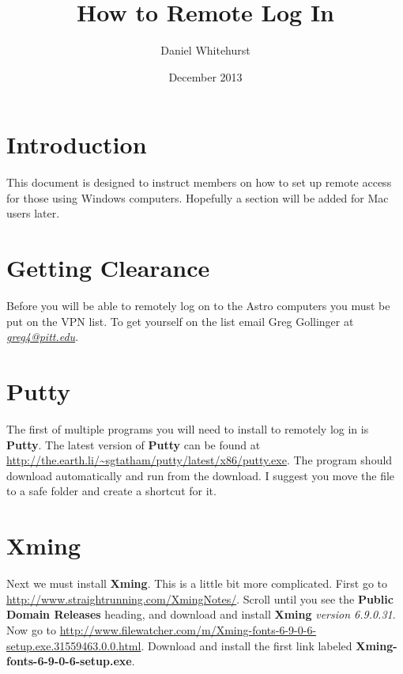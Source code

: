 \documentclass[11pt, preprint]{aastex}
\begin{document}
\title{How to Remote Log In}
\author{Daniel Whitehurst}
\date{December 2013}

\section{Introduction}
This document is designed to instruct members on how to set up remote access for those using Windows computers. Hopefully a section will be added for Mac users later.

\section{Getting Clearance}
Before you will be able to remotely log on to the Astro computers you must be put on the VPN list. To get yourself on the list email Greg Gollinger at \href{mailto:greg4@pitt.edu}{\emph{greg4@pitt.edu}}. 

\section{Putty}
The first of multiple programs you will need to install to remotely log in is \textbf{Putty}. The latest version of \textbf{Putty} can be found at \url{http://the.earth.li/~sgtatham/putty/latest/x86/putty.exe}. The program should download automatically and run from the download. I suggest you move the file to a safe folder and create a shortcut for it.

\section{Xming}
Next we must install \textbf{Xming}. This is a little bit more complicated. First go to \url{http://www.straightrunning.com/XmingNotes/}.
Scroll until you see the \textbf{Public Domain Releases} heading, and download and install \textbf{Xming} \emph{version 6.9.0.31}. Now go to \url{http://www.filewatcher.com/m/Xming-fonts-6-9-0-6-setup.exe.31559463.0.0.html}. Download and install the first link labeled \textbf{Xming-fonts-6-9-0-6-setup.exe}. 
\end{document}
